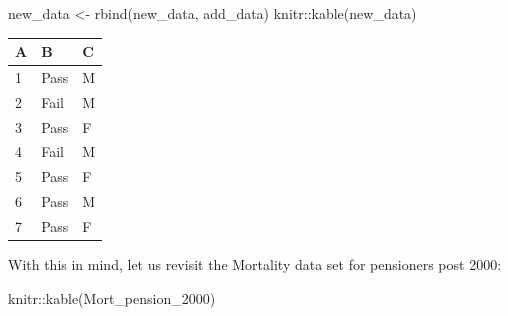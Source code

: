 \documentclass[
]{book}
\newenvironment{Shaded}{\begin{snugshade}}{\end{snugshade}}
\newcommand{\FunctionTok}[1]{\textcolor[rgb]{0.00,0.00,0.00}{#1}}
\newcommand{\NormalTok}[1]{#1}
\newcommand{\OtherTok}[1]{\textcolor[rgb]{0.56,0.35,0.01}{#1}}
\newcommand{\SpecialCharTok}[1]{\textcolor[rgb]{0.00,0.00,0.00}{#1}}
\theoremstyle{definition}
\theoremstyle{definition}
\theoremstyle{definition}
\theoremstyle{definition}
\theoremstyle{remark}
\begin{document}
\begin{Shaded}
\begin{Highlighting}[]
\NormalTok{new\_data }\OtherTok{\textless{}{-}} \FunctionTok{rbind}\NormalTok{(new\_data, add\_data)}
\NormalTok{knitr}\SpecialCharTok{::}\FunctionTok{kable}\NormalTok{(new\_data)}
\end{Highlighting}
\end{Shaded}

\begin{tabular}{l|l|l}
\hline
A & B & C\\
\hline
1 & Pass & M\\
\hline
2 & Fail & M\\
\hline
3 & Pass & F\\
\hline
4 & Fail & M\\
\hline
5 & Pass & F\\
\hline
6 & Pass & M\\
\hline
7 & Pass & F\\
\hline
\end{tabular}

With this in mind, let us revisit the Mortality data set for pensioners post 2000:

\begin{Shaded}
\begin{Highlighting}[]
\NormalTok{knitr}\SpecialCharTok{::}\FunctionTok{kable}\NormalTok{(Mort\_pension\_2000)}
\end{Highlighting}
\end{Shaded}
\end{document}
